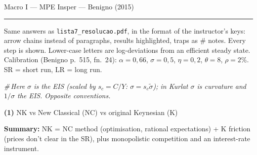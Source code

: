 \documentclass[11pt, a4paper]{article}
\newcommand{\nota}[1]{\par\hfill\textcolor{margem}{\small\itshape\#\,#1}\par}
\newcommand{\q}[1]{\par\medskip\needspace{4\baselineskip}\noindent\textbf{\large(#1)}\quad}
\begin{document}
\hfill
{\small Macro I --- MPE Insper --- Benigno (2015)}\\[-4pt]
\rule{\textwidth}{0.6pt}

{\small\textcolor{margem}{Same answers as \texttt{lista7\_resolucao.pdf}, in the format of the
instructor's keys: arrow chains instead of paragraphs, results highlighted, traps as \# notes.
Every step is shown. Lower-case letters are log-deviations from an efficient steady state.
Calibration (Benigno p.~515, fn.~24): $\alpha=0{,}66$, $\sigma=0{,}5$, $\eta=0{,}2$, $\theta=8$,
$\rho=2\%$. SR = short run, LR = long run.}}

\nota{Here $\sigma$ \emph{is} the EIS (scaled by $s_c=C/Y$: $\sigma=s_c\tilde\sigma$); in Kurlat
$\sigma$ is curvature and $1/\sigma$ the EIS. Opposite conventions.}

\q{1} NK vs New Classical (NC) vs original Keynesian (K)

\noindent\colorbox{hl}{\parbox{\dimexpr\linewidth-2\fboxsep}{\textbf{Summary:} NK = NC
method (optimisation, rational expectations) + K friction (prices don't clear in the SR),
plus monopolistic competition and an interest-rate instrument.}}
\end{document}
